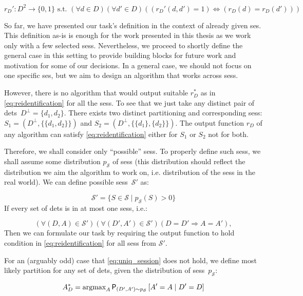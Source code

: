 $$
r_D' : D^2 \to \{0, 1\} \text{ s.t. } (\forall d \in D) (\forall d' \in D) ((r_D'(d, d') = 1) \Leftrightarrow (r_D(d) = r_D(d')))
$$

So far, we have presented our task's definition in the context of already given \gls{ses}. This definition as-is is enough for the work presented in this thesis as we work only with a few selected \glspl{ses}. Nevertheless, we proceed to shortly define the general case in this setting to provide building blocks for future work and motivation for some of our decisions. In a general case, we should not focus on one specific \gls{ses}, but we aim to design an algorithm that works across \glspl{ses}.


However, there is no algorithm that would output suitable $r_D^*$ as in \autoref{eq:reidentification} for all the \glspl{ses}. To see that we just take any distinct pair of \glspl{det}~$D^\bot = \{d_1, d_2\}$. There exists two distinct partitioning and corresponding \glspl{ses}: $S_1 = (D^\bot, \{\{d_1, d_2\}\})$ and $S_2 = (D^\bot, \{\{d_1\}, \{d_2\}\})$. The output function $r_D$ of any algorithm can satisfy \autoref{eq:reidentification} either for $S_1$ or $S_2$ not for both.


Therefore, we shall consider only ``possible'' \glspl{ses}. To properly define such \glspl{ses}, we shall assume some distribution $p_\mathcal{S}$ of \glspl{ses} (this distribution should reflect the distribution we aim the algorithm to work on, i.e. distribution of the \glspl{ses} in the real world). We can define possible \glspl{ses}~$\mathcal{S'}$ as:

$$\mathcal{S}' = \{S \in \mathcal{S} \mid p_\mathcal{S}(S) > 0\}$$
If every set of \glspl{det} is in at most one \glspl{ses}, i.e.:

\begin{equation}
    (\forall (D, A) \in \mathcal{S}')(\forall (D', A') \in \mathcal{S}') (D = D' \Rightarrow A = A'),
    \label{eq:uniq_session}
\end{equation}
Then we can formulate our task by requiring the output function to hold
condition in \autoref{eq:reidentification} for all
\glspl{ses} from $\mathcal{S}'$.

For an (arguably odd) case that \autoref{eq:uniq_session} does not hold, we
define most likely partition for any set of \glspl{det}, given the distribution
of \glspl{ses}~$p_\mathcal{S}$: 

\begin{equation}
A^*_D = \text{argmax}_A \operatorname{\textsf{P}}_{(D', A')\sim p_\mathcal{S}} \left[A' = A \mid D' = D\right]
\label{eq:mla}
\end{equation}

